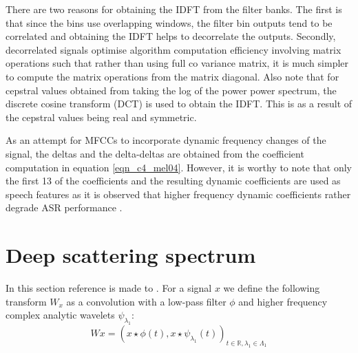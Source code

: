 There are two reasons for obtaining the IDFT from the filter banks.  The first is that since the bins use overlapping windows, the filter bin outputs tend to be correlated and obtaining the IDFT helps to decorrelate the outputs.  Secondly, decorrelated signals optimise algorithm computation efficiency involving matrix operations such that rather than using full co variance matrix, it is much simpler to compute the matrix operations from the matrix diagonal.  Also note that for cepstral values obtained from taking the log of the power power spectrum, the discrete cosine transform (DCT) is used to obtain the IDFT.  This is as a result of the cepstral values being real and symmetric\citep{gales2008application}.

As an attempt for MFCCs to incorporate dynamic frequency changes of the signal, the deltas and the delta-deltas are obtained from the coefficient computation in equation \ref{eqn_c4_mel04}.  However, it is worthy to note that only the first 13 of the coefficients and the resulting dynamic coefficients are used as speech features as it is observed that higher frequency dynamic coefficients rather degrade ASR performance \citep{gales2008application}.

\section{Deep scattering spectrum}
In this section reference is made to \citep{anden2011multiscale, anden2014deep, zeghidour2016deep}. For a signal $x$ we define the following transform $W_x$ as a convolution with a low-pass filter $\phi$ and higher frequency complex analytic wavelets $\psi_{\lambda_1}$:
\begin{equation}
Wx=(x\star\phi(t),x\star\psi_{\lambda_1}(t))_{t\in\mathbb{R},\lambda_1\in\Lambda_1} \label{eqn_c4_dss01}
\end{equation}

